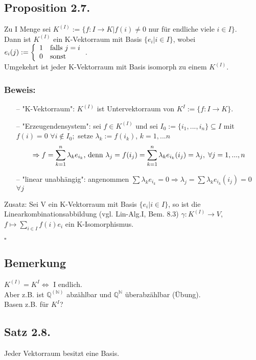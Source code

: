 \documentclass[a4paper, 12pt]{extarticle}
\newcommand{\twopartdef}[4] {
	\left\{
		\begin{array}{ll}
			#1 & #2 \\
			#3 & #4
		\end{array}
	\right.
}
\newcommand{\tn}[1]{\textnormal {#1}}
\begin{document}
\subsection*{Proposition 2.7.}
Zu I Menge sei $K^{(I)} := \{f:I\rightarrow K | f(i) \neq 0$ nur für endliche viele $i\in I\}$. \\
Dann ist $K^{(I)}$ ein K-Vektorraum mit Basis $\{e_i|i\in I\}$, wobei $e_i(j):= \twopartdef { 1 } {\tn{falls } j=i} {0} {\tn{sonst}}$. \\
Umgekehrt ist jeder K-Vektorraum mit Basis isomorph zu einem $K^{(I)}$.
\subsubsection*{Beweis:}
\begin{itemize}
\item[--] "K-Vektorraum": $K^{(I)}$ ist Untervektorraum von $K^I := \{f:I\rightarrow K\}$.
\item[--] "Erzeugendensystem": sei $f\in K^{(I)}$ und sei $I_0 := \{i_1,...,i_n\} \subseteq I$ mit $f(i) = 0$ $\forall i \notin I_0;$ setze $\lambda_k := f(i_k)$, $k=1,...n$ 
$$ \Rightarrow f = \sum_{k=1}^n \lambda_k e_{i_k}\tn{, denn }\lambda_j = f(i_j) = \sum_{k=1}^n \lambda_k e_{i_k}(i_j) = \lambda_j, \hspace*{1mm} \forall j = 1,...,n$$
\item[--] "linear unabhängig": angenommen $\sum \lambda_k e_{i_k} = 0 \Rightarrow \lambda_j = \sum \lambda_k e_{i_k}(i_j) = 0$ $\forall j$
\end{itemize}
Zusatz: Sei V ein K-Vektorraum mit Basis $\{e_i | i \in I\}$, so ist die Linearkombinationsabbildung (vgl. Lin-Alg.I, Bem. 8.3)
$\gamma: K^{(I)} \rightarrow V$, $f\mapsto \sum_{i\in I} f(i)e_i$ ein K-Isomorphismus.
\begin{flushright}
$\square$\\
\end{flushright}
\subsection*{Bemerkung}
$K^{(I)}=K^I \Leftrightarrow$ I endlich. \\
Aber z.B. ist $\mathbb Q^{(\mathbb N)}$ abzählbar und $\mathbb Q^\mathbb N$ überabzählbar (Übung). \\
Basen z.B. für $K^I$?
\subsection*{Satz 2.8.}
Jeder Vektorraum besitzt eine Basis.
\end{document}
